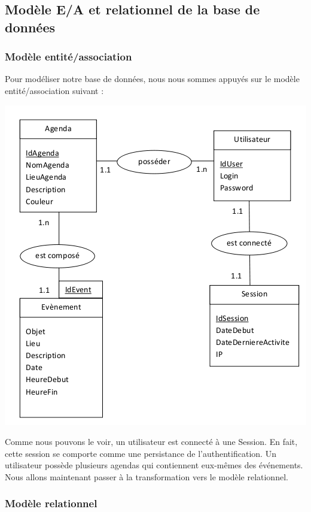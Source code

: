 \documentclass[12pt , a4paper]{article}
\begin{document}
\newpage
\subsection{Modèle E/A et relationnel de la base de données}

\subsubsection{Modèle entité/association}
\noindent Pour modéliser notre base de données, nous nous sommes appuyés sur le modèle entité/association suivant :
\begin{center}
  \includegraphics[scale=0.8]{./images/EA.png}
\end{center}

\noindent Comme  nous pouvons le voir,  un utilisateur est connecté  à une Session. En  fait, cette session se  comporte comme une persistance  de l'authentification. Un  utilisateur possède plusieurs
agendas qui contiennent eux-m\^emes des événements.\\
Nous allons maintenant passer à la transformation vers le modèle relationnel.

\subsubsection{Modèle relationnel}
\end{document}
